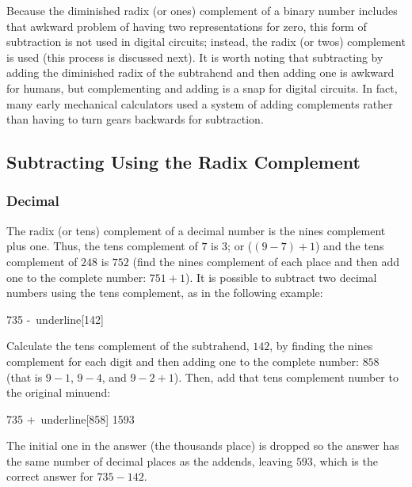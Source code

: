 Because the diminished radix (or ones) complement of a binary number includes that awkward problem of having two representations for zero, this form of subtraction is not used in digital circuits; instead, the radix (or twos) complement is used (this process is discussed next). It is worth noting that subtracting by adding the diminished radix of the subtrahend and then adding one is awkward for humans, but complementing and adding is a snap for digital circuits. In fact, many early mechanical calculators used a system of adding complements rather than having to turn gears backwards for subtraction. 

\subsection{Subtracting Using the Radix Complement}
\label{MO:sub:subtracting_using_radix_complement}

\subsubsection{Decimal}
\label{MO:subsub:decimal_subtraction_with_radix_complement}

The radix (or tens) complement of a decimal number is the nines complement plus one. Thus, the tens complement of $ 7 $ is $ 3 $; or ($ (9-7)+1 $) and the tens complement of $ 248 $ is $ 752 $ (find the nines complement of each place and then add one to the complete number: $ 751 + 1 $). It is possible to subtract two decimal numbers using the tens complement, as in the following example: 

\begin{binDisp}[commandchars=~\[\]]
     735
    -~underline[142]
\end{binDisp}

Calculate the tens complement of the subtrahend, $ 142 $, by finding the nines complement for each digit and then adding one to the complete number: $ 858 $ (that is $ 9-1 $, $ 9-4 $, and $ 9-2+1 $). Then, add that tens complement number to the original minuend: 

\begin{binDisp}[commandchars=~\[\]]
     735
    +~underline[858]
    1593
\end{binDisp}

The initial one in the answer (the thousands place) is dropped so the answer has the same number of decimal places as the addends, leaving $ 593 $, which is the correct answer for $ 735-142 $.

